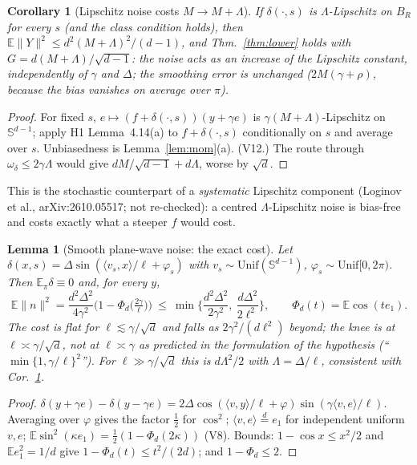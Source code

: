 \documentclass[11pt,a4paper]{article}
\numberwithin{equation}{section}
\newtheorem{lemma}[theorem]{Lemma}
\newtheorem{corollary}[theorem]{Corollary}
\theoremstyle{definition}
\theoremstyle{remark}
\newcommand{\E}{\mathbb E}\newcommand{\R}{\mathbb R}\newcommand{\Z}{\mathbb Z}\newcommand{\Prob}{\mathbb P}
\newcommand{\norm}[1]{\lVert #1\rVert}\newcommand{\abs}[1]{\lvert #1\rvert}\newcommand{\ip}[2]{\langle #1,#2\rangle}
\newcommand{\Unif}{\mathrm{Unif}}\newcommand{\TV}{\mathrm{TV}}\newcommand{\BC}{\mathrm{BC}}\newcommand{\tmix}{t_{\rm mix}}
\newcommand{\Sph}{\mathbb S^{d-1}}\newcommand{\Ball}{\mathbb B}\newcommand{\iid}{\mathrm{iid}}
\begin{document}
\begin{corollary}[Lipschitz noise costs $M\to M+\Lambda$]\label{cor:lip}
If $\delta(\cdot,s)$ is $\Lambda$-Lipschitz on $B_R$ for every $s$ (and the class condition holds), then $\E\norm Y^2\le d^2(M+\Lambda)^2/(d-1)$, and Thm.~\ref{thm:lower} holds with $G=d(M+\Lambda)/\sqrt{d-1}$: the noise acts as an increase of the Lipschitz constant, independently of $\gamma$ and $\Delta$; the smoothing error is unchanged ($2M(\gamma+\rho)$, because the bias vanishes on average over $\pi$).
\end{corollary}
\begin{proof}
For fixed $s$, $e\mapsto(f+\delta(\cdot,s))(y+\gamma e)$ is $\gamma(M+\Lambda)$-Lipschitz on $\Sph$; apply H1 Lemma~4.14(a) to $f+\delta(\cdot,s)$ conditionally on $s$ and average over $s$. Unbiasedness is Lemma~\ref{lem:mom}(a). (V12.) The route through $\omega_\delta\le2\gamma\Lambda$ would give $dM/\sqrt{d-1}+d\Lambda$, worse by $\sqrt d$.
\end{proof}
\begin{sloppypar}\noindent This is the stochastic counterpart of a \emph{systematic} Lipschitz component (Loginov et al., arXiv:2610.05517;
not re-checked): a centred $\Lambda$-Lipschitz noise is bias-free and costs exactly what a steeper $f$ would cost.\end{sloppypar}

\begin{lemma}[Smooth plane-wave noise: the exact cost]\label{lem:sin}
Let $\delta(x,s)=\Delta\sin(\ip{v_s}x/\ell+\varphi_s)$ with $v_s\sim\Unif(\Sph)$, $\varphi_s\sim\Unif[0,2\pi)$. Then $\E_\pi\delta\equiv0$ and, for every $y$,
\[
\E\norm n^2=\frac{d^2\Delta^2}{4\gamma^2}\Big(1-\Phi_d\big(\tfrac{2\gamma}\ell\big)\Big)\ \le\ \min\Big\{\frac{d^2\Delta^2}{2\gamma^2},\ \frac{d\Delta^2}{2\ell^2}\Big\},\qquad \Phi_d(t)=\E\cos(te_1).
\]
The cost is flat for $\ell\lesssim\gamma/\sqrt d$ and falls as $2\gamma^2/(d\ell^2)$ beyond; the knee is at $\ell\asymp\gamma/\sqrt d$, not at $\ell\asymp\gamma$ as predicted in the formulation of the hypothesis (``$\min\{1,\gamma/\ell\}^2$''). For $\ell\gg\gamma/\sqrt d$ this is $d\Lambda^2/2$ with $\Lambda=\Delta/\ell$, consistent with Cor.~\ref{cor:lip}.
\end{lemma}
\begin{proof}
$\delta(y+\gamma e)-\delta(y-\gamma e)=2\Delta\cos(\ip vy/\ell+\varphi)\sin(\gamma\ip ve/\ell)$. Averaging over $\varphi$ gives the factor $\frac12$ for $\cos^2$; $\ip ve\overset{d}=e_1$ for independent uniform $v,e$; $\E\sin^2(\kappa e_1)=\frac12(1-\Phi_d(2\kappa))$ (V8). Bounds: $1-\cos x\le x^2/2$ and $\E e_1^2=1/d$ give $1-\Phi_d(t)\le t^2/(2d)$; and $1-\Phi_d\le2$.
\end{proof}
\end{document}
